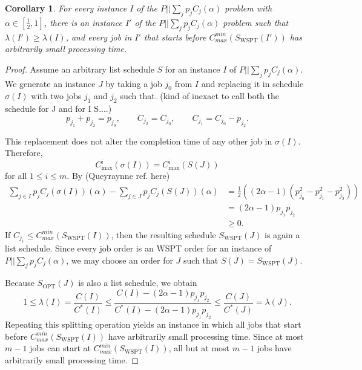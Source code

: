 \documentclass{article}
\newtheorem{corollary}{Corollary}
\newcommand{\WSPT}{\mathrm{WSPT}}
\newcommand{\OPT}{\mathrm{OPT}}
\begin{document}
\begin{corollary}\label{Corr: Splitting Jobs}
For every instance $I$ of the $P||\sum_j p_j C_j(\alpha)$ problem with $\alpha \in [\frac12,1]$, there is an
instance $I'$ of the $P||\sum_j p_j C_j(\alpha)$ problem such that
$\lambda(I')\geq\lambda(I)$, and every job in $I'$ that starts before
$C_{max}^{min}(S_{\WSPT}(I'))$ has arbitrarily small processing time.
\end{corollary}

\begin{proof}
Assume an arbitrary list schedule $S$ for an instance $I$ of
$P||\sum_j p_j C_j (\alpha)$. We generate an instance $J$ by taking a job $j_0$ from
$I$ and replacing it in schedule $\sigma(I)$ with two jobs $j_1$ and $j_2$ such
that. (kind of inexact to call both the schedule for J and for I S....)
\[
        p_{j_1}+p_{j_2}=p_{j_0},
        \qquad
        C_{j_2}=C_{j_0},
        \qquad
        C_{j_1}=C_{j_0}-p_{j_2}.
\]


This replacement does not alter the completion time of any other job in
$\sigma(I)$. Therefore,
\[
        C_{\max}^i(\sigma(I))=C_{\max}^i(S(J))
\]
for all $1\leq i\leq m$. By  (Queyraynne ref. here)
\begin{align*}
        \sum_{j\in I}p_j C_j(\sigma(I))(\alpha)-\sum_{j\in J}p_j C_j(S(J))(\alpha) 
        &=
        \frac12((2\alpha-1)(p_{j_0}^2-p_{j_1}^2-p_{j_2}^2))\\
        &=
        (2\alpha-1)p_{j_1}p_{j_2}\\
        &\ge 0.
\end{align*}
If $C_{j_1}\leq C_{max}^{min}(S_{\WSPT}(I))$, then the resulting schedule
$S_{\WSPT}(J)$ is again a list schedule. Since every job order is an WSPT order
for an instance of $P||\sum_j p_j C_j(\alpha)$, we may choose an order for $J$ such
that $S(J)=S_{\WSPT}(J)$.

Because $S_{\OPT}(J)$ is also a list schedule, we obtain
\[
        1\leq \lambda(I)
        =
        \frac{C(I)}{C^*(I)}
        \leq
        \frac{C(I)-(2\alpha-1)p_{j_1}p_{j_2}}{C^*(I)-(2\alpha-1)p_{j_1}p_{j_2}}
        \leq
        \frac{C(J)}{C^*(J)}
        =
        \lambda(J).
\]
Repeating this splitting operation yields an instance in which all jobs that
start before $C_{max}^{min}(S_{\WSPT}(I))$ have arbitrarily small processing time.
Since at most $m-1$ jobs can start at $C_{max}^{min}(S_{\WSPT}(I))$, all but at most
$m-1$ jobs have arbitrarily small processing time.
\end{proof}
\end{document}
